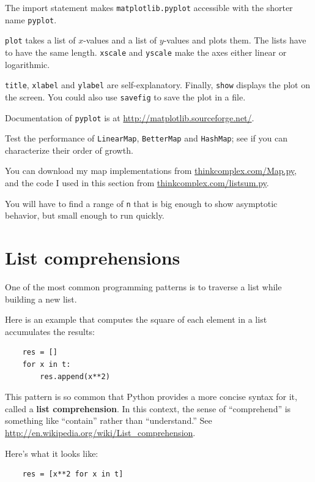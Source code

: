 \documentclass[10pt]{book}
\begin{document}
The import statement makes {\tt matplotlib.pyplot} accessible
with the shorter name {\tt pyplot}.

{\tt plot} takes a list of $x$-values and a list of $y$-values and
plots them.  The lists have to have the same length.
{\tt xscale} and {\tt yscale} make the axes either linear or logarithmic.

{\tt title}, {\tt xlabel} and {\tt ylabel} are self-explanatory.
Finally, {\tt show} displays the plot on the screen.  You could also
use {\tt savefig} to save the plot in a file.

Documentation of {\tt pyplot} is at \url{http://matplotlib.sourceforge.net/}.


\begin{exercise}

Test the performance of
{\tt LinearMap}, {\tt BetterMap} and {\tt HashMap}; see if you
can characterize their order of growth.

You can download my map implementations from
\url{thinkcomplex.com/Map.py}, and the code I used in this section
from \url{thinkcomplex.com/listsum.py}.

You will have to find a range
of {\tt n} that is big enough to show asymptotic behavior, but small
enough to run quickly.

\end{exercise}


\section{List comprehensions}

One of the most common programming patterns is to traverse
a list while building a new list.

Here is an example that computes the square of each element in
a list accumulates the results:

\begin{verbatim}
    res = []
    for x in t:
        res.append(x**2)
\end{verbatim}

This pattern is so common that Python provides a more
concise syntax for it, called a {\bf list comprehension}.
In this context, the sense of ``comprehend'' is something
  like ``contain'' rather than ``understand.''  See
  \url{http://en.wikipedia.org/wiki/List_comprehension}.

Here's what it looks like:

\begin{verbatim}
    res = [x**2 for x in t]
\end{verbatim}
\end{document}
